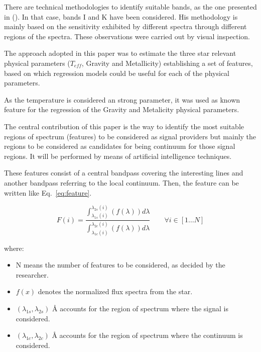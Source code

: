 {
There are technical methodologies to identify suitable bands, as the one 
presented in (\cite{2013A&A...549A.129C}). %
In that case, bands I and K have been considered. His methodology is
mainly based on the sensitivity exhibited by different spectra through
different regions of the spectra. These observations were carried out by 
visual inspection.
}

{
The approach adopted in this paper was to estimate the three star relevant physical 
parameters ($T_{eff}$, Gravity and Metallicity) establishing a set of features, based on which
regression models could be useful for each of the physical parameters.

As the temperature is considered an strong parameter, it was used as known feature 
for the regression of the Gravity and Metalicity physical parameters.

The central contribution of this paper is the way to identify the most suitable
regions of spectrum (features) to be considered as signal providers 
but mainly the regions to be considered 
as candidates for being continuum for those signal regions.
It will be performed by means of artificial intelligence techniques.

These features consist of
a central bandpass covering the interesting lines and another bandpass
referring to the local continuum. Then, the feature can be written like 
Eq.~\eqref{eq:feature}.

\begin{equation}\label{eq:feature}
  F(i) =  \frac{ \int_{\lambda_{1s}(i)}^{\lambda_{2s}(i)} \left(f(\lambda)\right) d{\lambda}}
               { \int_{\lambda_{1c}(i)}^{\lambda_{2c}(i)} \left(f(\lambda)\right) d{\lambda}} 
               \quad \quad \forall i \in [1 \ldots N]
\end{equation}


where:
\begin{itemize}
 \item {N means the number of features to be considered, as decided by the researcher.}
 \item {$f(x)$ denotes the normalized flux spectra from the star.}
 \item {$(\lambda_{1s},\lambda_{2s})$ {\AA} accounts for the region of spectrum where the signal is considered. \quad \label{eq:cons1}}
 \item {$(\lambda_{1c},\lambda_{2c})$ {\AA} accounts for the region of spectrum where the continuum is considered.}
\end{itemize}

}
